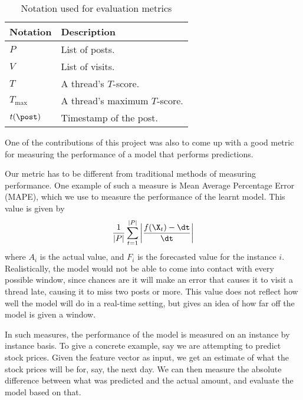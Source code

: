 
\renewcommand{\P}{Pr}

%
\begin{table}
\begin{center}
\begin{tabular}{l l}
	\hline
Notation	&	Description		\\
	\hline
$P$			&	List of posts. \\
$V$			&	List of visits.\\
$T$			&	A thread's $T$-score. \\
	$T_\text{max}$	&	A thread's maximum $T$-score. \\
$t(\post)$	&	Timestamp of the post.\\
	\hline
\end{tabular}
\end{center}
	\caption{Notation used for evaluation metrics}
\end{table}


One of the contributions of this project was also to come up with a good metric 
for measuring the performance of a model that performs predictions. 

Our metric has to be different from traditional methods of measuring 
performance. One example of such a measure is Mean Average Percentage Error 
(MAPE), which we use to measure the performance of the learnt model. This value 
is given by
\[
	\frac{1}{|P|}\sum^{|P|}_{t=1}\left|\frac{f(\X_t) - \dt}{\dt}\right|
\]
where $A_i$ is the actual value, and $F_i$ is the forecasted value for the 
instance $i$. Realistically, the model would not be able to come into contact 
with every possible window, since chances are it will make an error that causes 
it to visit a thread late, causing it to miss two posts or more. This value does 
not reflect how well the model will do in a real-time setting, but gives an idea 
of how far off the model is given a window.

In such measures, the performance of the model is measured on an instance by 
instance basis. To give a concrete example, say we are attempting to predict 
stock prices. Given the feature vector as input, we get an estimate of what the 
stock prices will be for, say, the next day. We can then measure the absolute 
difference between what was predicted and the actual amount, and evaluate the 
model based on that.

